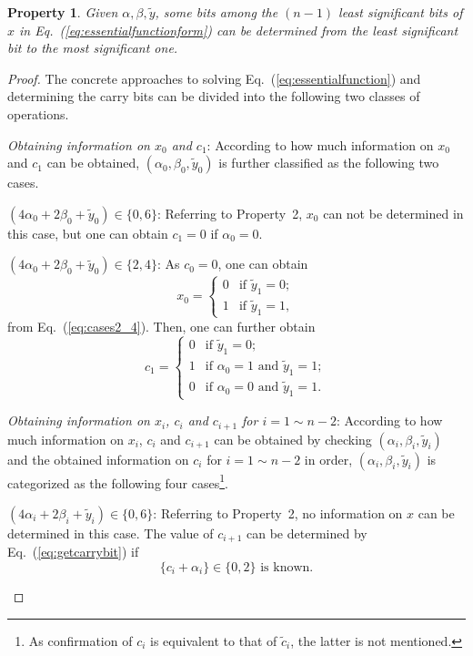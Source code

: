 \documentclass{ws-ijbc}
\newtheorem{property}{Property}
\begin{document}
\begin{property}
Given $\alpha, \beta, \tilde{y}$, some bits among the $(n-1)$ least significant bits of $x$ in Eq.~(\ref{eq:essentialfunctionform}) can be determined from the least significant bit to the most significant one.
\label{propsition:solution}
\end{property}
\begin{proof}
The concrete approaches to solving Eq.~(\ref{eq:essentialfunction}) and determining the carry bits can be divided into the following two classes of operations.
\begin{itemlist}
\item \textit{Obtaining information on $x_0$ and $c_1$}:
According to how much information on $x_0$ and $c_1$ can be obtained, $(\alpha_0, \beta_0, \tilde{y}_0)$ is further classified as the following two cases.
\begin{itemlist}
\item $(4\alpha_0+2\beta_0+\tilde{y}_0)\in\{0, 6\}$:
Referring to Property~2, $x_0$ can not be determined in this case, but one can obtain $c_1=0$ if $\alpha_0=0$.

\item $(4\alpha_0+2\beta_0+\tilde{y}_0)\in\{2, 4\}$: As $c_0=0$, one can obtain
\begin{equation}
x_0=
\begin{cases}
0 & \mbox{if } \tilde{y}_{1}=0;\\
1 & \mbox{if } \tilde{y}_{1}=1,
\end{cases}
\label{eq:x0}
\end{equation}
from Eq.~(\ref{eq:cases2_4}). Then, one can further obtain
\begin{equation*}
c_1=
\begin{cases}
0 & \mbox{if } \tilde{y}_{1}=0;\\
1 & \mbox{if } \alpha_0=1 \mbox{ and }\tilde{y}_{1}=1;\\
0 & \mbox{if } \alpha_0=0 \mbox{ and }\tilde{y}_{1}=1.
\end{cases}
\end{equation*}
\end{itemlist}

\item \textit{Obtaining information on $x_i$, $c_i$ and $c_{i+1}$ for $i=1\sim n-2$}:
According to how much information on $x_i$, $c_i$ and $c_{i+1}$ can be obtained by checking $(\alpha_i, \beta_i, \tilde{y}_i)$ and the obtained information on $c_i$ for $i=1\sim n-2$ in order, $(\alpha_i, \beta_i, \tilde{y}_i)$ is categorized as the following four cases\footnote{As confirmation of $c_i$ is equivalent to that of $\tilde{c}_i$, the latter is not mentioned.}.
\begin{itemlist}
\item $(4\alpha_i+2\beta_i+\tilde{y}_i)\in\{0, 6\}$:
Referring to Property~2, no information on $x$ can be determined in this case.
The value of $c_{i+1}$ can be determined by Eq.~(\ref{eq:getcarrybit}) if
\begin{equation}
\{c_i+\alpha_i\}\in \{0, 2\}\mbox{ is known.}
\label{eq:condition}
\end{equation}


\end{itemlist}
\end{itemlist}
\end{proof}
\end{document}
